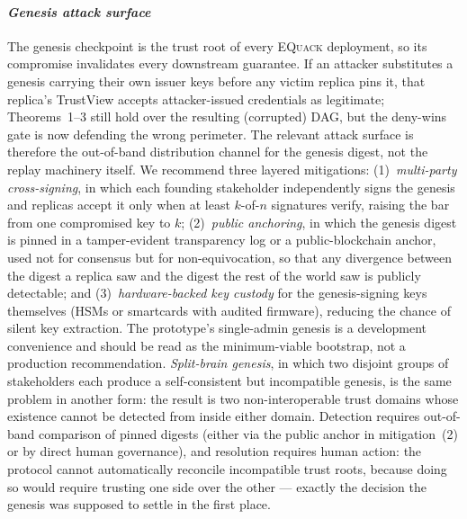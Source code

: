 \documentclass[10pt,journal,compsoc]{IEEEtran}
\newcommand{\equack}{\textsc{EQuack}}
\begin{document}
\paragraph*{\textit{Genesis attack surface}}
The genesis checkpoint is the trust root of every \equack{} deployment, so its compromise invalidates every downstream guarantee. If an attacker substitutes a genesis carrying their own issuer keys before any victim replica pins it, that replica's TrustView accepts attacker-issued credentials as legitimate; Theorems~1--3 still hold over the resulting (corrupted) DAG, but the deny-wins gate is now defending the wrong perimeter. The relevant attack surface is therefore the out-of-band distribution channel for the genesis digest, not the replay machinery itself. We recommend three layered mitigations: (1)~\emph{multi-party cross-signing}, in which each founding stakeholder independently signs the genesis and replicas accept it only when at least $k$-of-$n$ signatures verify, raising the bar from one compromised key to $k$; (2)~\emph{public anchoring}, in which the genesis digest is pinned in a tamper-evident transparency log or a public-blockchain anchor, used not for consensus but for non-equivocation, so that any divergence between the digest a replica saw and the digest the rest of the world saw is publicly detectable; and (3)~\emph{hardware-backed key custody} for the genesis-signing keys themselves (HSMs or smartcards with audited firmware), reducing the chance of silent key extraction. The prototype's single-admin genesis is a development convenience and should be read as the minimum-viable bootstrap, not a production recommendation. \emph{Split-brain genesis}, in which two disjoint groups of stakeholders each produce a self-consistent but incompatible genesis, is the same problem in another form: the result is two non-interoperable trust domains whose existence cannot be detected from inside either domain. Detection requires out-of-band comparison of pinned digests (either via the public anchor in mitigation~(2) or by direct human governance), and resolution requires human action: the protocol cannot automatically reconcile incompatible trust roots, because doing so would require trusting one side over the other --- exactly the decision the genesis was supposed to settle in the first place.
\end{document}
